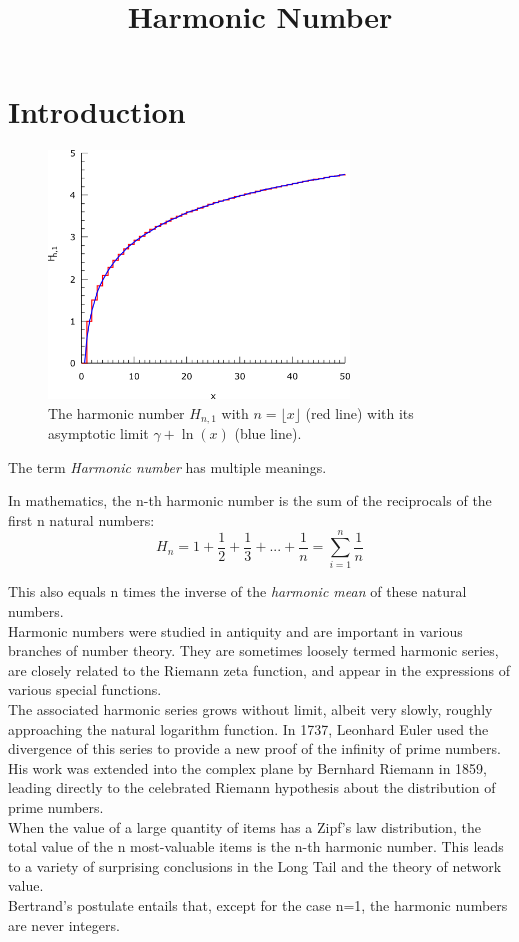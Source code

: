 \documentclass[2pt]{article}
\title{Harmonic Number}
\begin{document}
\date{\vspace{-5ex}}
\maketitle
\section{Introduction}
\begin{figure}
\includegraphics[width=8cm]{1.png}\caption{\small{The harmonic number $H_{n,1}$ with $n=\lfloor{x}\rfloor$ (red line) with its asymptotic limit $\gamma+\ln(x)$ (blue line).}}\end{figure}
\begin{flushleft}
The term \emph{Harmonic number} has multiple meanings.
\end{flushleft}
In mathematics, the n-th harmonic number is the sum of the reciprocals of the first n natural numbers:
\begin{equation}
H_{n}=1+\frac{1}{2}+\frac{1}{3}+...+\frac{1}{n}=\sum_{i=1}^n \frac{1}{n} \label{nth harmonic number}
\end{equation}

This also equals n times the inverse of the \emph{harmonic mean} of these natural numbers.\\
Harmonic numbers were studied in antiquity and are important in various branches of number theory. They are sometimes loosely termed harmonic series, are closely related to the Riemann zeta function, and appear in the expressions of various special functions.\\
The associated harmonic series grows without limit, albeit very slowly, roughly approaching the natural logarithm function. In 1737, Leonhard Euler used the divergence of this series to provide a new proof of the infinity of prime numbers. His work was extended into the complex plane by Bernhard Riemann in 1859, leading directly to the celebrated Riemann hypothesis about the distribution of prime numbers.\\
When the value of a large quantity of items has a Zipf's law distribution, the total value of the n most-valuable items is the n-th harmonic number. This leads to a variety of surprising conclusions in the Long Tail and the theory of network value.\\
Bertrand's postulate entails that, except for the case n=1, the harmonic numbers are never integers.
\\
\end{document}
